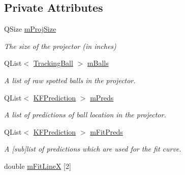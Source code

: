 \subsection*{Private Attributes}
\begin{DoxyCompactItemize}
\item 
Q\+Size \hyperlink{classProjectorWindow_a6efbf5e0c399c9afec2413b319da5524}{m\+Proj\+Size}\hypertarget{classProjectorWindow_a6efbf5e0c399c9afec2413b319da5524}{}\label{classProjectorWindow_a6efbf5e0c399c9afec2413b319da5524}

\begin{DoxyCompactList}\small\item\em The size of the projector (in inches) \end{DoxyCompactList}\item 
Q\+List$<$ \hyperlink{classTrackingBall}{Tracking\+Ball} $>$ \hyperlink{classProjectorWindow_ad6c57feadadd884eb119d1b9fea536ad}{m\+Balls}\hypertarget{classProjectorWindow_ad6c57feadadd884eb119d1b9fea536ad}{}\label{classProjectorWindow_ad6c57feadadd884eb119d1b9fea536ad}

\begin{DoxyCompactList}\small\item\em A list of raw spotted balls in the projector. \end{DoxyCompactList}\item 
Q\+List$<$ \hyperlink{classKFPrediction}{K\+F\+Prediction} $>$ \hyperlink{classProjectorWindow_a87c9f61abd49b0df3f636023665dce5d}{m\+Preds}\hypertarget{classProjectorWindow_a87c9f61abd49b0df3f636023665dce5d}{}\label{classProjectorWindow_a87c9f61abd49b0df3f636023665dce5d}

\begin{DoxyCompactList}\small\item\em A list of predictions of ball location in the projector. \end{DoxyCompactList}\item 
Q\+List$<$ \hyperlink{classKFPrediction}{K\+F\+Prediction} $>$ \hyperlink{classProjectorWindow_ae9a016128679fead0d12cc643655498a}{m\+Fit\+Preds}\hypertarget{classProjectorWindow_ae9a016128679fead0d12cc643655498a}{}\label{classProjectorWindow_ae9a016128679fead0d12cc643655498a}

\begin{DoxyCompactList}\small\item\em A \mbox{[}sub\mbox{]}list of predictions which are used for the fit curve. \end{DoxyCompactList}\item 
double \hyperlink{classProjectorWindow_af305927ad115e41a1a73aafcf1bac854}{m\+Fit\+LineX} \mbox{[}2\mbox{]}\hypertarget{classProjectorWindow_af305927ad115e41a1a73aafcf1bac854}{}\label{classProjectorWindow_af305927ad115e41a1a73aafcf1bac854}


\end{DoxyCompactItemize}
